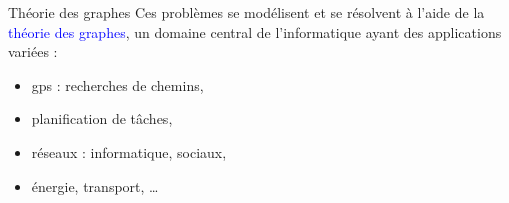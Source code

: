 \documentclass[10pt]{beamer}
\begin{document}
\begin{frame}[fragile]{\Ctitle}{\stitle}
	\begin{block}{Théorie des graphes}
		Ces problèmes se modélisent et se résolvent à l'aide de la \textcolor{blue}{théorie des graphes}, un domaine central de l'informatique ayant des applications variées :
		\begin{itemize}
			\item<1-> {\sc gps} : recherches de chemins,
			\item<2-> planification de tâches,
			\item<3-> réseaux : informatique, sociaux,
			\item<4-> énergie, transport, \dots
		\end{itemize}
	\end{block}
\end{frame}
\end{document}
